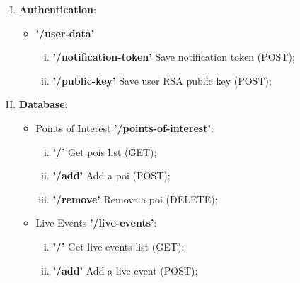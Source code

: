 \documentclass[../../main]{subfiles}
\begin{document}
\begin{enumerate}[I)]
    \item \textbf{Authentication}:
    \begin{itemize}
        \item \textbf{'/user-data'}
        \begin{enumerate}[i)]
            \item \textbf{'/notification-token'} Save notification token (POST);
            \item \textbf{'/public-key'} Save user RSA public key (POST);
        \end{enumerate}
    \end{itemize}
    
    \item \textbf{Database}:
    \begin{itemize}
        \item Points of Interest \textbf{'/points-of-interest'}:
        
        \begin{enumerate}[i)]
            \item \textbf{'/'} Get pois list (GET);
            \item \textbf{'/add'} Add a poi (POST);
            \item \textbf{'/remove'} Remove a poi (DELETE);
        \end{enumerate}
    
        \item Live Events \textbf{'/live-events'}:
        \begin{enumerate}[i)]
            \item \textbf{'/'} Get live events list (GET);
            \item \textbf{'/add'} Add a live event (POST);
        \end{enumerate}
    

\end{itemize}
\end{enumerate}
\end{document}

